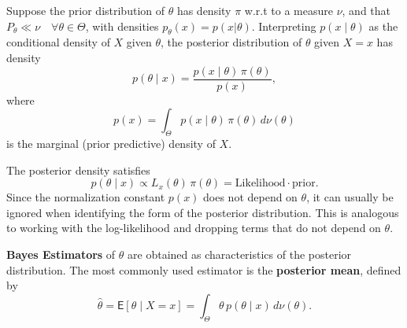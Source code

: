 

\begin{theo}
Suppose the prior distribution of \(\theta\) has density \(\pi\) w.r.t to a measure \(\nu\), and that
\(P_{\theta} \ll \nu \quad \forall \theta \in \Theta\), with densities
\(p_{\theta}(x) = p(x | \theta)\).
Interpreting \(p(x \mid \theta)\) as the conditional density of \(X\) given \(\theta\), the posterior distribution of \(\theta\) given \(X = x\) has density
\[
p(\theta \mid x)
= \frac{p(x \mid \theta)\,\pi(\theta)}{p(x)},
\]
where
\[
p(x) = \int_{\Theta} p(x \mid \theta)\,\pi(\theta)\, d\nu(\theta)
\]
is the marginal (prior predictive) density of \(X\).
\end{theo}

\begin{note}
The posterior density satisfies
\[
p(\theta \mid x) \propto L_x(\theta)\,\pi(\theta) = \text{Likelihood}\cdot \text{prior}.
\]
Since the normalization constant \(p(x)\) does not depend on \(\theta\), it can usually be ignored when identifying the form of the posterior distribution.
This is analogous to working with the log-likelihood and dropping terms that do not depend on \(\theta\).
\end{note}

\textbf{Bayes Estimators}
 of \(\theta\) are obtained as characteristics of the posterior distribution.
The most commonly used estimator is the \textbf{posterior mean}, defined by
\[
\hat{\theta}
= \mathsf{E}[\theta \mid X = x]
= \int_{\Theta} \theta \, p(\theta \mid x)\, d\nu(\theta).
\]


